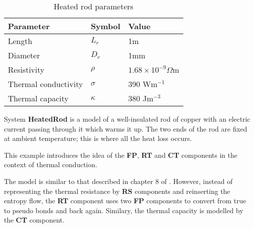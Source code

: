 

\begin{table}[htbp]
  \begin{center}
    \leavevmode
    \begin{tabular}{l l l}
      \hline
      Parameter & Symbol & Value  \\
      \hline
      Length & $L_r$ & 1m \\
      Diameter & $D_r$ & 1mm \\
      Resistivity & $\rho$ & $1.68\times10^{-9} \Omega$m \\
      Thermal conductivity & $\sigma$ & 390 W$\text{m}^{-1}$\\
      Thermal capacity & $\kappa$ & 380 J$\text{m}^{-3}$\\
      \hline
    \end{tabular}
    \caption{Heated rod parameters}
    \label{tab:rod}
  \end{center}
\end{table}

 System \textbf{HeatedRod} is a model of a well-insulated rod of copper with an
 electric current passing through it which warms it up. The two ends of
 the rod are fixed at ambient temperature; this is where all the heat
 loss occurs. 
 
 This example introduces the idea of the {\bf FP}, \textbf{RT} and
 \textbf{CT} components in the context of thermal conduction.
 
 The model is similar to that described in chapter 8 of .
 However, instead of representing the thermal resistance by {\bf RS}
 components and reinserting the entropy flow, the {\bf RT} component
 uses two {\bf FP} components to convert from true to pseudo bonds and
 back again. Similary, the thermal capacity is modelled by the {\bf
   CT} component.
 
